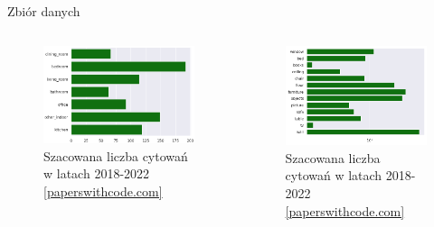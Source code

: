 \documentclass[10pt]{beamer}
\begin{document}
\begin{frame}{Zbiór danych}
    \begin{columns}
        \begin{column}{0.5\textwidth}
            \begin{figure}
                \includegraphics[width=\textwidth]{images/scene.png}
                \caption[]{Szacowana liczba cytowań w latach 2018-2022 \href{https://paperswithcode.com/dataset/sun-rgb-d}{[paperswithcode.com]}}
            \end{figure}
            
        \end{column}

        \begin{column}{0.5\textwidth}
            
            \begin{figure}
                \includegraphics[width=\textwidth]{images/eda-seg13.png}
                \caption[]{Szacowana liczba cytowań w latach 2018-2022 \href{https://paperswithcode.com/dataset/sun-rgb-d}{[paperswithcode.com]}}
            \end{figure}
        \end{column}
    \end{columns}
\end{frame}
\end{document}
